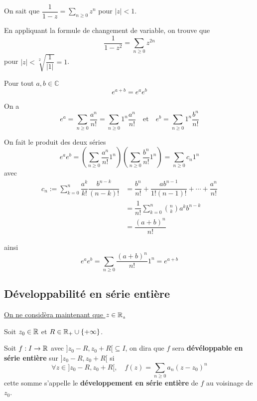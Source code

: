 \documentclass[a4paper,12pt]{article}
\begin{document}
\begin{exemple}
    On sait que $\dfrac{1}{1 - z} = \sum_{n \geq 0} z^n$ pour $|z| < 1$.

    En appliquant la formule de changement de variable, on trouve que
    $$
    \dfrac{1}{1 - z^2} = \sum_{n \geq 0} z^{2n}
    $$
    pour $|z| < \sqrt[2]{\dfrac{1}{|1|}} = 1$.
\end{exemple}

\begin{proposition}{}{}
    Pour tout $a, b \in \mathbb{C}$
    $$
    e^{a + b} = e^a e^b
    $$
\end{proposition}

\begin{demonstration}
    On a
    $$
    e^a = \sum_{n \geq 0} \dfrac{a^n}{n!} = \sum_{n \geq 0} 1^n \dfrac{a^n}{n!}
    \quad \text{et} \quad
    e^b = \sum_{n \geq 0} 1^n \dfrac{b^n}{n!}
    $$

    On fait le produit des deux séries
    $$
    e^a e^b = \left(\sum_{n \geq 0} \dfrac{a^n}{n!} 1^n \right)\left( \sum_{n \geq 0} \dfrac{b^n}{n!} 1^n \right) = \sum_{n \geq 0} c_n 1^n
    $$
    avec
    \begin{align*}
        c_n := \sum_{k = 0}^n \dfrac{a^k}{k!} \dfrac{b^{n-k}}{(n-k)!} &= \dfrac{b^n}{n!} + \dfrac{ab^{n-1}}{1!(n-1)!} + \cdots + \dfrac{a^n}{n!} \\
        &= \dfrac{1}{n!} \sum_{k = 0}^n \binom{n}{k} a^k b^{n-k} \\
        &= \dfrac{(a + b)^n}{n!}
    \end{align*}

    ainsi
    $$
    e^a e^b = \sum_{n \geq 0} \dfrac{(a + b)^n}{n!} 1^n = e^{a + b}
    $$
\end{demonstration}

\subsection{Développabilité en série entière}

\underline{On ne considèra maintenant que $z \in \mathbb{R}$.}

\begin{definition}
    Soit $z_0 \in \mathbb{R}$ et $R \in \mathbb{R}_+ \cup \{+\infty\}$.

    Soit $f: I \to \mathbb{R}$ avec $]z_0 - R, z_0 + R[ \subseteq I$, on dira que $f$ sera \textbf{dévéloppable en série entière} sur $]z_0 - R, z_0 + R[$ si
    $$
    \forall z \in ]z_0 - R, z_0 + R[, \quad f(z) = \sum_{n \geq 0} a_n (z - z_0)^n
    $$
    cette somme s'appelle le \textbf{développement en série entière} de $f$ au voisinage de $z_0$.
\end{definition}
\end{document}
